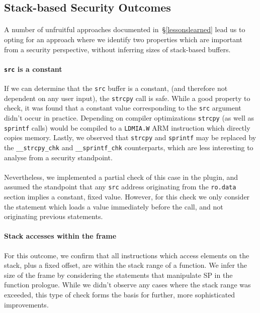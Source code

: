 \documentclass[letterpaper,11pt]{article}
\begin{document}
\subsection{Stack-based Security Outcomes}
\label{stackoutcomes}

\paragraph{}
A number of unfruitful approaches documented in~\S\ref{lessonslearned} lead us
to opting for an approach where we identify two properties which are important
from a security perspective, without inferring sizes of stack-based buffers.

\paragraph{\texttt{src} is a constant}
If we can determine that the \texttt{src} buffer is a constant, (and therefore
not dependent on any user input), the \texttt{strcpy} call is safe. While a
good property to check, it was found that a constant value corresponding to the
\texttt{src} argument didn't occur in practice. Depending on compiler
optimizations \texttt{strcpy} (as well as \texttt{sprintf} calls) would be
compiled to a \texttt{LDMIA.W} ARM instruction which directly copies memory.
Lastly, we observed that \texttt{strcpy} and \texttt{sprintf} may be replaced
by the \texttt{\_\_strcpy\_chk} and \texttt{\_\_sprintf\_chk} counterparts,
which are less interesting to analyse from a security standpoint.

\paragraph{}
Nevertheless, we implemented a partial check of this case in the plugin, and
assumed the standpoint that any \texttt{src} address originating from the
\texttt{ro.data} section implies a constant, fixed value. However, for this
check we only consider the statement which loads a value immediately before the
call, and not originating previous statements. %

\paragraph{Stack accesses within the frame}
For this outcome, we confirm that all instructions which access elements on
the stack, plus a fixed offset, are within the stack range of a function. We
infer the size of the frame by considering the statements that manipulate
SP in the function prologue. While we didn't observe any cases where the
stack range was exceeded, this type of check forms the basis for further,
more sophisticated improvements.
\end{document}
